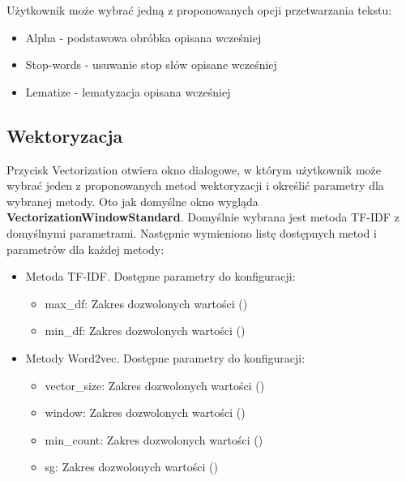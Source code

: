 			Użytkownik może wybrać jedną z proponowanych opcji przetwarzania tekstu:

			\begin{itemize}
				\item Alpha - podstawowa obróbka opisana wcześniej
				\item Stop-words - usuwanie stop słów opisane wcześniej
				\item Lematize - lematyzacja opisana wcześniej
			\end{itemize}
			
	\subsection{Wektoryzacja}
		Przycisk Vectorization otwiera okno dialogowe, w którym użytkownik może wybrać jeden z proponowanych metod wektoryzacji i określić parametry dla wybranej metody. Oto jak domyślne okno wygląda \textbf{VectorizationWindowStandard}. Domyślnie wybrana jest metoda TF-IDF z domyślnymi parametrami.
		Następnie wymieniono listę dostępnych metod i parametrów dla każdej metody:
		\begin{itemize}
			\item Metoda TF-IDF. Dostępne parametry do konfiguracji:
			\begin{itemize}
				\item max\_df: Zakres dozwolonych wartości ()
				\item min\_df: Zakres dozwolonych wartości ()
			\end{itemize}
			\item Metody Word2vec. Dostępne parametry do konfiguracji:
			\begin{itemize}
				\item vector\_size: Zakres dozwolonych wartości ()
				\item window: Zakres dozwolonych wartości ()
				\item min\_count: Zakres dozwolonych wartości ()
				\item sg: Zakres dozwolonych wartości ()
			\end{itemize}
		\end{itemize}
			
